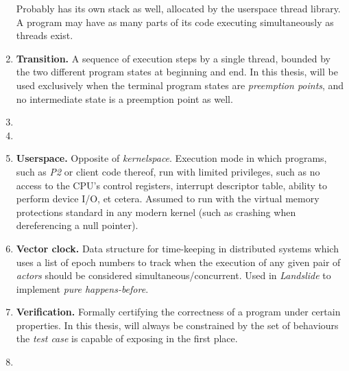 \begin{enumerate}
		Probably has its own stack as well, allocated by the userspace thread library.
		A program may have as many parts of its code executing simultaneously as threads exist.
	\item {\bf Transition.}
		A sequence of execution steps by a single thread,
		bounded by the two different program states at beginning and end.
		In this thesis, will be used exclusively when the terminal program states are {\em preemption points},
		and no intermediate state is a preemption point as well.
	\item {}
	\item {}
	\item {\bf Userspace.}
		Opposite of {\em kernelspace}.
		Execution mode in which programs, such as {\em P2} or client code thereof,
		run with limited privileges,
		such as no access to the CPU's control registers, interrupt descriptor table, ability to perform device I/O,
		et cetera.
		Assumed to run with the virtual memory protections standard in any modern kernel
		(such as crashing when dereferencing a null pointer).
	\item {\bf Vector clock.}
		Data structure for time-keeping in distributed systems which uses a list of epoch numbers
		to track when the execution of any given pair of {\em actors} should be considered simultaneous/concurrent.
		Used in {\em Landslide} to implement {\em pure happens-before}.
	\item {\bf Verification.}
		Formally certifying the correctness of a program under certain properties.
		In this thesis, will always be constrained by the set of behaviours
		the {\em test case} is capable of exposing in the first place.
	\item {}
\end{enumerate}

